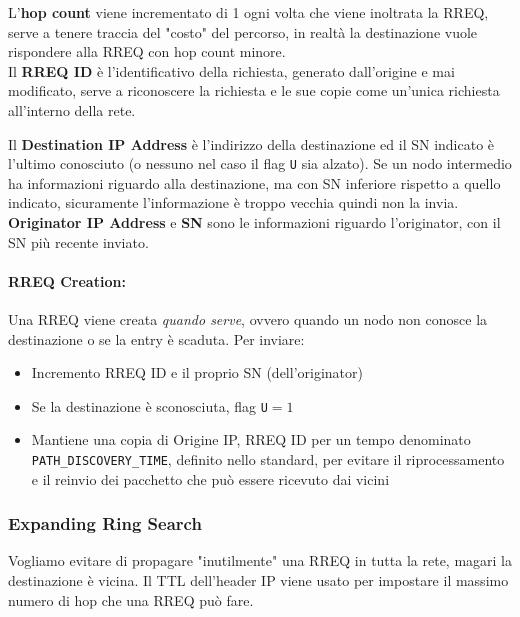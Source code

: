 L'\textbf{hop count} viene incrementato di 1 ogni volta che viene inoltrata la RREQ, serve a tenere traccia del "costo" del percorso, in realtà la destinazione vuole rispondere alla RREQ con hop count minore.\\

Il \textbf{RREQ ID} è l'identificativo della richiesta, generato dall'origine e mai modificato, serve a riconoscere la richiesta e le sue copie come un'unica richiesta all'interno della rete.\\

\newpage

Il \textbf{Destination IP Address} è l'indirizzo della destinazione ed il SN indicato è l'ultimo conosciuto (o nessuno nel caso il flag \texttt{U} sia alzato). Se un nodo intermedio ha informazioni riguardo alla destinazione, ma con SN inferiore rispetto a quello indicato, sicuramente l'informazione è troppo vecchia quindi non la invia.\\

\textbf{Originator IP Address} e \textbf{SN} sono le informazioni riguardo l'originator, con il SN più recente inviato.\\

\paragraph{RREQ Creation:} Una RREQ viene creata \textit{quando serve}, ovvero quando un nodo non conosce la destinazione o se la entry è scaduta. Per inviare:
\begin{itemize}
	\item Incremento RREQ ID e il proprio SN (dell'originator)
	\item Se la destinazione è sconosciuta, flag \texttt{U}$=1$
	\item Mantiene una copia di Origine IP, RREQ ID per un tempo denominato \texttt{PATH\_DISCOVERY\_TIME}, definito nello standard, per evitare il riprocessamento e il reinvio dei pacchetto che può essere ricevuto dai vicini
\end{itemize}

\subsubsection{Expanding Ring Search}
 Vogliamo evitare di propagare "inutilmente" una RREQ in tutta la rete, magari la destinazione è vicina. Il TTL dell'header IP viene usato per impostare il massimo numero di hop che una RREQ può fare.\\

